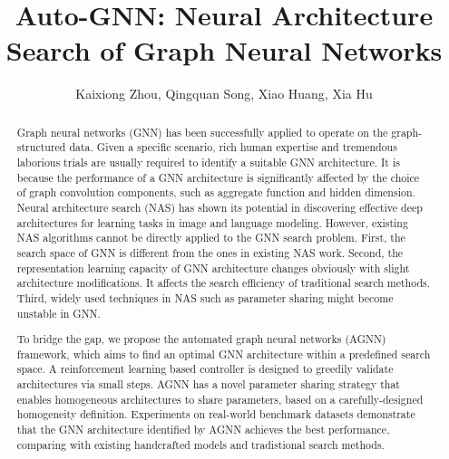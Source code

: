 \documentclass[sigconf]{acmart}
\begin{document}
\title{Auto-GNN: Neural Architecture Search of Graph Neural Networks}
\author{Kaixiong Zhou, Qingquan Song, Xiao Huang, Xia Hu}














\begin{abstract}
Graph neural networks (GNN) has been successfully applied to operate on the graph-structured data. Given a specific scenario, rich human expertise and tremendous laborious trials are usually required to identify a suitable GNN architecture. It is because the performance of a GNN architecture is significantly affected by the choice of graph convolution components, such as aggregate function and hidden dimension. Neural architecture search (NAS) has shown its potential in discovering effective deep architectures for learning tasks in image and language modeling. However, existing NAS algorithms cannot be directly applied to the GNN search problem. First, the search space of GNN is different from the ones in existing NAS work. Second, the representation learning capacity of GNN architecture changes obviously with slight architecture modifications. It affects the search efficiency of traditional search methods. Third, widely used techniques in NAS such as parameter sharing might become unstable in GNN.

To bridge the gap, we propose the automated graph neural networks (AGNN) framework, which aims to find an optimal GNN architecture within a predefined search space. A reinforcement learning based controller is designed to greedily validate architectures via small steps. AGNN has a novel parameter sharing strategy that enables homogeneous architectures to share parameters, based on a carefully-designed homogeneity definition. Experiments on real-world benchmark datasets demonstrate that the GNN architecture identified by AGNN achieves the best performance, comparing with existing handcrafted models and tradistional search methods. 
\end{abstract}
\end{document}
